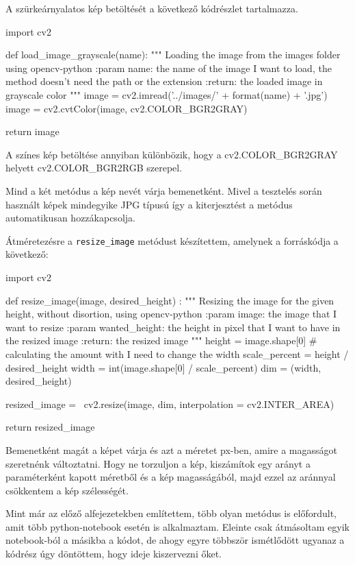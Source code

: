 A szürkeárnyalatos kép betöltését a következő kódrészlet tartalmazza.
\begin{python}
import cv2

def load_image_grayscale(name):
    """
    Loading the image from the images folder using opencv-python
    :param name: the name of the image I want to load,
        the method doesn't need the path or the extension
    :return: the loaded image in grayscale color
    """
    image = cv2.imread('../images/' + format(name) + '.jpg')
    image = cv2.cvtColor(image, cv2.COLOR_BGR2GRAY)

    return image
\end{python}
A színes kép betöltése annyiban különbözik, hogy a cv2.COLOR\_BGR2GRAY helyett cv2.COLOR\_BGR2RGB szerepel.

Mind a két metódus a kép nevét várja bemenetként. Mivel a tesztelés során használt képek mindegyike JPG típusú így a kiterjesztést a metódus automatikusan hozzákapcsolja.


Átméretezésre a \texttt{resize\_image} metódust készítettem, amelynek a forráskódja a következő:
\begin{python}
import cv2

def resize_image(image, desired_height) :
    """
    Resizing the image for the given height,
    without disortion, using opencv-python
    :param image: the image that I want to resize
    :param wanted_height: the height in pixel that
        I want to have in the resized image
    :return: the resized image
    """
    height = image.shape[0]
    # calculating the amount with I need to change the width
    scale_percent = height / desired_height
    width = int(image.shape[0] / scale_percent)
    dim = (width, desired_height)

    resized_image = \
        cv2.resize(image, dim, interpolation = cv2.INTER_AREA)

    return resized_image
\end{python}
Bemenetként magát a képet várja és azt a méretet px-ben, amire a magasságot szeretnénk változtatni. Hogy ne torzuljon a kép, kiszámítok egy arányt a paraméterként kapott méretből és a kép magasságából, majd ezzel az aránnyal csökkentem a kép szélességét.


Mint már az előző alfejezetekben említettem, több olyan metódus is előfordult, amit több python-notebook esetén is alkalmaztam. Eleinte csak átmásoltam egyik notebook-ból a másikba a kódot, de ahogy egyre többször ismétlődött ugyanaz a kódrész úgy döntöttem, hogy ideje kiszervezni őket.

